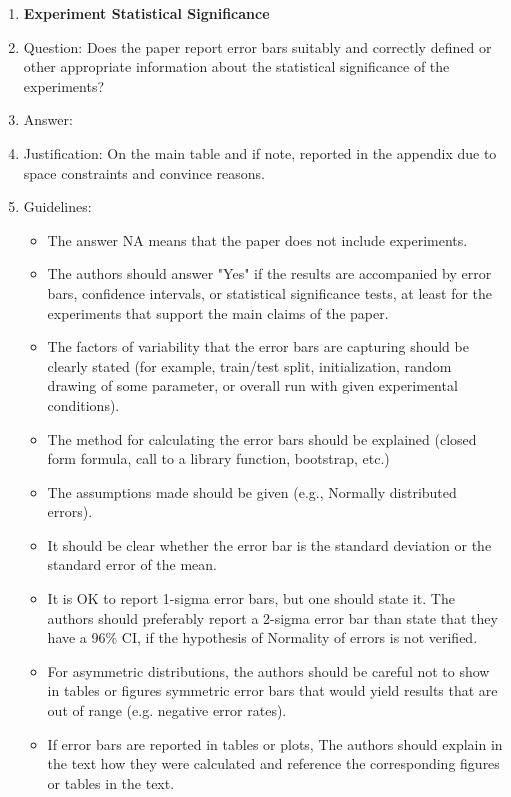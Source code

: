 \documentclass{article}
\begin{document}
\begin{enumerate}
\item {\bf Experiment Statistical Significance}
    \item[] Question: Does the paper report error bars suitably and correctly defined or other appropriate information about the statistical significance of the experiments?
    \item[] Answer: \answerYes{} %
    \item[] Justification: On the main table and if note, reported in the appendix due to space constraints and convince reasons.
    \item[] Guidelines:
    \begin{itemize}
        \item The answer NA means that the paper does not include experiments.
        \item The authors should answer "Yes" if the results are accompanied by error bars, confidence intervals, or statistical significance tests, at least for the experiments that support the main claims of the paper.
        \item The factors of variability that the error bars are capturing should be clearly stated (for example, train/test split, initialization, random drawing of some parameter, or overall run with given experimental conditions).
        \item The method for calculating the error bars should be explained (closed form formula, call to a library function, bootstrap, etc.)
        \item The assumptions made should be given (e.g., Normally distributed errors).
        \item It should be clear whether the error bar is the standard deviation or the standard error of the mean.
        \item It is OK to report 1-sigma error bars, but one should state it. The authors should preferably report a 2-sigma error bar than state that they have a 96\% CI, if the hypothesis of Normality of errors is not verified.
        \item For asymmetric distributions, the authors should be careful not to show in tables or figures symmetric error bars that would yield results that are out of range (e.g. negative error rates).
        \item If error bars are reported in tables or plots, The authors should explain in the text how they were calculated and reference the corresponding figures or tables in the text.
    \end{itemize}


\end{enumerate}
\end{document}
